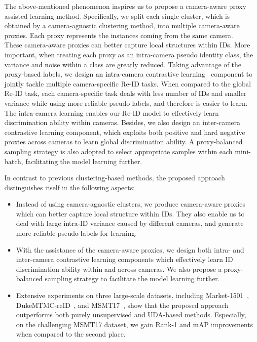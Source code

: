 \documentclass[letterpaper]{article} \usepackage{aaai21}  \usepackage{times}  \usepackage{helvet} \usepackage{courier}  \usepackage[hyphens]{url}  \usepackage{graphicx} \usepackage{subcaption}
\begin{document}
The above-mentioned phenomenon inspires us to propose a camera-aware proxy assisted learning method. Specifically, we split each single cluster, which is obtained by a camera-agnostic clustering method, into multiple camera-aware proxies. Each proxy represents the instances coming from the same camera. These camera-aware proxies can better capture local structures within IDs. More important, when treating each proxy as an intra-camera pseudo identity class, the variance and noise within a class are greatly reduced. Taking advantage of the proxy-based labels, we design an intra-camera contrastive learning~\cite{Chen2020SimCLR} component to jointly tackle multiple camera-specific Re-ID tasks. When compared to the global Re-ID task, each camera-specific task deals with less number of IDs and smaller variance while using more reliable pseudo labels, and therefore is easier to learn. The intra-camera learning enables our Re-ID model to effectively learn discrimination ability within cameras. Besides, we also design an inter-camera contrastive learning component, which exploits both positive and hard negative proxies across cameras to learn global discrimination ability. A proxy-balanced sampling strategy is also adopted to select appropriate samples within each mini-batch, facilitating the model learning further. 


In contrast to previous clustering-based methods, the proposed approach distinguishes itself in the following aspects:
\begin{itemize}
	\item Instead of using camera-agnostic clusters, we produce camera-aware proxies which can better capture local structure within IDs. They also enable us to deal with large intra-ID variance caused by different cameras, and generate more reliable pseudo labels for learning. 
	\item With the assistance of the camera-aware proxies, we design both intra- and inter-camera contrastive learning components which effectively learn ID discrimination ability within and across cameras. We also propose a proxy-balanced sampling strategy to facilitate the model learning further. 
	\item Extensive experiments on three large-scale datasets, including Market-1501~\cite{7410490}, DukeMTMC-reID~\cite{zheng2017unlabeled}, and MSMT17~\cite{wei2018person}, show that the proposed approach outperforms both purely unsupervised and UDA-based methods. Especially, on the challenging MSMT17 dataset, we gain  Rank-1 and  mAP improvements when compared to the second place. 
\end{itemize}
\end{document}
